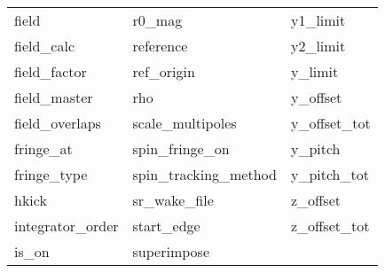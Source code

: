 \begin{tabular}{lll}
field                       & r0_mag                      & y1_limit                    \\
field_calc                  & reference                   & y2_limit                    \\
field_factor                & ref_origin                  & y_limit                     \\
field_master                & rho                         & y_offset                    \\
field_overlaps              & scale_multipoles            & y_offset_tot                \\
fringe_at                   & spin_fringe_on              & y_pitch                     \\
fringe_type                 & spin_tracking_method        & y_pitch_tot                 \\
hkick                       & sr_wake_file                & z_offset                    \\
integrator_order            & start_edge                  & z_offset_tot                \\
is_on                       & superimpose                 &                             \\
 \bottomrule
 \end{tabular}
 \vfill
 
